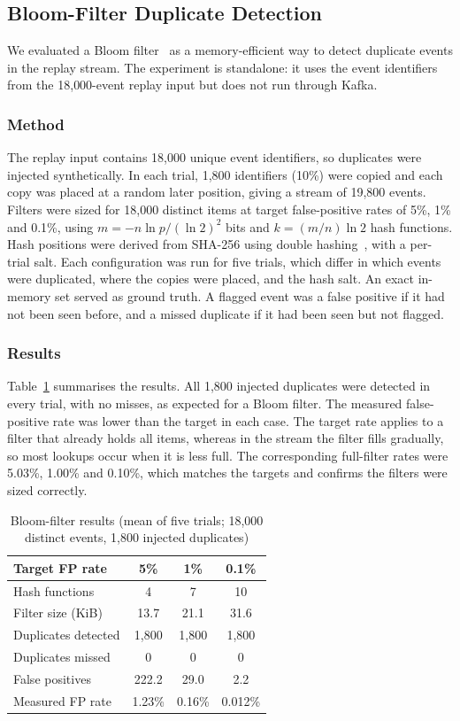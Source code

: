 \subsection{Bloom-Filter Duplicate Detection}

We evaluated a Bloom filter~\cite{bloom1970} as a memory-efficient way to detect
duplicate events in the replay stream. The experiment is standalone: it uses the
event identifiers from the 18{,}000-event replay input but does not run through Kafka.

\subsubsection{Method}
The replay input contains 18{,}000 unique event identifiers, so duplicates were
injected synthetically. In each trial, 1{,}800 identifiers (10\%) were copied and
each copy was placed at a random later position, giving a stream of 19{,}800
events. Filters were sized for 18{,}000 distinct items at target false-positive
rates of 5\%, 1\% and 0.1\%, using $m=-n\ln p/(\ln 2)^2$ bits and
$k=(m/n)\ln 2$ hash functions. Hash positions were derived from SHA-256 using double hashing~\cite{kirsch2008less}, with a per-trial salt. Each configuration was run for five trials, which differ in which
events were duplicated, where the copies were placed, and the hash salt. An exact
in-memory set served as ground truth. A flagged event was a false positive if it
had not been seen before, and a missed duplicate if it had been seen but not flagged.

\subsubsection{Results}
Table~\ref{tab:bloom} summarises the results. All 1{,}800 injected duplicates were
detected in every trial, with no misses, as expected for a Bloom filter. The
measured false-positive rate was lower than the target in each case. The target
rate applies to a filter that already holds all items, whereas in the stream the
filter fills gradually, so most lookups occur when it is less full. The
corresponding full-filter rates were 5.03\%, 1.00\% and 0.10\%, which matches the
targets and confirms the filters were sized correctly.

\begin{table}[t]
\caption{Bloom-filter results (mean of five trials; 18{,}000 distinct events, 1{,}800 injected duplicates)}
\label{tab:bloom}
\centering
\begin{tabular}{lccc}
\hline
Target FP rate & 5\% & 1\% & 0.1\% \\
\hline
Hash functions & 4 & 7 & 10 \\
Filter size (KiB) & 13.7 & 21.1 & 31.6 \\
Duplicates detected & 1{,}800 & 1{,}800 & 1{,}800 \\
Duplicates missed & 0 & 0 & 0 \\
False positives & 222.2 & 29.0 & 2.2 \\
Measured FP rate & 1.23\% & 0.16\% & 0.012\% \\
\hline
\end{tabular}
\end{table}

